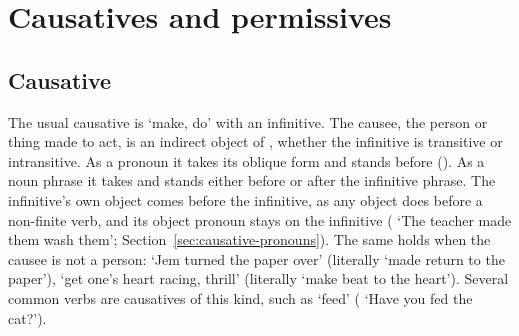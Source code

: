 \section{Causatives and permissives}\label{sec:causatives}

\subsection{Causative }
The usual causative is  `make, do' with an infinitive. The causee, the person or thing made to act, is an indirect object of , whether the infinitive is transitive or intransitive. As a pronoun it takes its oblique form and stands before  (). As a noun phrase it takes  and stands either before or after the infinitive phrase. The infinitive's own object comes before the infinitive, as any object does before a non-finite verb, and its object pronoun stays on the infinitive ( `The teacher made them wash them'; Section~\ref{sec:causative-pronouns}).
The same holds when the causee is not a person:  `Jem turned the paper over' (literally `made return to the paper'),  `get one's heart racing, thrill' (literally `make beat to the heart'). Several common verbs are causatives of this kind, such as  `feed' ( `Have you fed the cat?').

